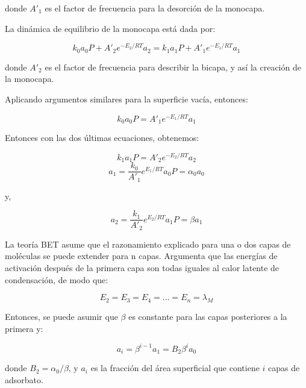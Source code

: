 \documentclass[11pt]{book}
\begin{document}
donde $A'_1$ es el factor de frecuencia para la desorción de la monocapa.

La dinámica de equilibrio de la monocapa está dada por:

\begin{equation}
    \label{eq:isotermabet_2}
    k_0 a_0 P + A'_2 e^{-E_2/RT} a_2 = k_1 a_1 P + A'_1 e^{-E_1/RT} a_1
\end{equation}

donde $A'_2$ es el factor de frecuencia para describir la bicapa, y así la creación de la monocapa.

Aplicando argumentos similares para la superficie vacía, entonces:

\begin{equation}
    \label{eq:isotermabet_3}
    k_0 a_0 P = A'_1 e^{-E_1/RT} a_1
\end{equation}

Entonces con las dos últimas ecuaciones, obtenemos:

\begin{equation*}
    k_1 a_1 P = A'_2 e^{-E_2/RT} a_2
\end{equation*}
\begin{equation}
    \label{eq:isotermabet_4}
    a_1 = \frac{k_0}{A'_1} e^{E_1/RT} a_0 P = \alpha_0 a_0
\end{equation}

y,

\begin{equation}
    \label{eq:isotermabet_5}
    a_2 = \frac{k_1}{A'_2} e^{E_2/RT} a_1 P = \beta a_1
\end{equation}

La teoría BET asume que el razonamiento explicado para una o dos capas de moléculas se puede extender para n capas. Argumenta que las energías de activación después de la primera capa son todas iguales al calor latente de condensación, de modo que:

\begin{equation}
    E_2 = E_3 = E_4 = ... = E_n = \lambda_M
\end{equation}

Entonces, se puede asumir que $\beta$ es constante para las capas posteriores a la primera y:

\begin{equation}
    a_i = \beta^{i-1} a_1 = B_2 \beta^i a_0
\end{equation}

donde $B_2=\alpha_0/\beta$, y $a_i$ es la fracción del área superficial que contiene $i$ capas de adsorbato. 
\end{document}
